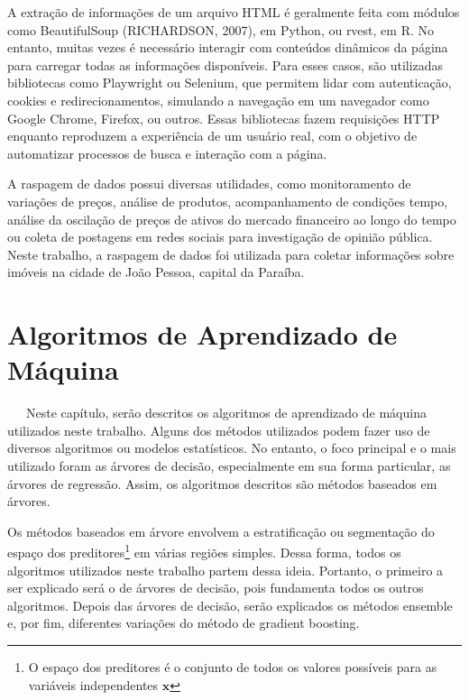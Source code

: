 \documentclass[
  12pt,
  a4paper,
]{scrreprt}
\begin{document}
A extração de informações de um arquivo HTML é geralmente feita com
módulos como BeautifulSoup (RICHARDSON, 2007), em Python, ou rvest, em
R. No entanto, muitas vezes é necessário interagir com conteúdos
dinâmicos da página para carregar todas as informações disponíveis. Para
esses casos, são utilizadas bibliotecas como Playwright ou Selenium, que
permitem lidar com autenticação, cookies e redirecionamentos, simulando
a navegação em um navegador como Google Chrome, Firefox, ou outros.
Essas bibliotecas fazem requisições HTTP enquanto reproduzem a
experiência de um usuário real, com o objetivo de automatizar processos
de busca e interação com a página.

\vspace{12pt}

A raspagem de dados possui diversas utilidades, como monitoramento de
variações de preços, análise de produtos, acompanhamento de condições
tempo, análise da oscilação de preços de ativos do mercado financeiro ao
longo do tempo ou coleta de postagens em redes sociais para investigação
de opinião pública. Neste trabalho, a raspagem de dados foi utilizada
para coletar informações sobre imóveis na cidade de João Pessoa, capital
da Paraíba.

\newpage

\chapter{Algoritmos de Aprendizado de
Máquina}\label{algoritmos-de-aprendizado-de-muxe1quina}

~~~Neste capítulo, serão descritos os algoritmos de aprendizado de
máquina utilizados neste trabalho. Alguns dos métodos utilizados podem
fazer uso de diversos algoritmos ou modelos estatísticos. No entanto, o
foco principal e o mais utilizado foram as árvores de decisão,
especialmente em sua forma particular, as árvores de regressão. Assim,
os algoritmos descritos são métodos baseados em árvores.

\vspace{12pt}

Os métodos baseados em árvore envolvem a estratificação ou segmentação
do espaço dos preditores\footnote{O espaço dos preditores é o conjunto
  de todos os valores possíveis para as variáveis independentes
  \(\mathbf{x}\)} em várias regiões simples. Dessa forma, todos os
algoritmos utilizados neste trabalho partem dessa ideia. Portanto, o
primeiro a ser explicado será o de árvores de decisão, pois fundamenta
todos os outros algoritmos. Depois das árvores de decisão, serão
explicados os métodos ensemble e, por fim, diferentes variações do
método de gradient boosting.
\end{document}
